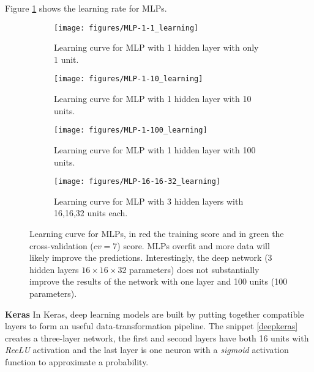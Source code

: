 \documentclass[11pt]{article}
\begin{document}
Figure \ref{fig:mlp_learning} shows the learning rate for MLPs.
\begin{figure}[h]
    \centering
    \begin{subfigure}[t]{1\textwidth}
        \centering
        \texttt{[image: figures/MLP-1-1\_learning]}
        \caption{Learning curve for MLP with 1 hidden layer with only 1 unit.}
    \end{subfigure}

    \begin{subfigure}[t]{1\textwidth}
        \centering
        \texttt{[image: figures/MLP-1-10\_learning]}
        \caption{Learning curve for MLP with 1 hidden layer with 10 units.}
    \end{subfigure}%

    \begin{subfigure}[t]{1\textwidth}
        \centering
        \texttt{[image: figures/MLP-1-100\_learning]}
        \caption{Learning curve for MLP with 1 hidden layer with 100 units.}
    \end{subfigure}%

    \begin{subfigure}[t]{1\textwidth}
        \centering
        \texttt{[image: figures/MLP-16-16-32\_learning]}
        \caption{Learning curve for MLP with 3 hidden layers with 16,16,32 units each.}
    \end{subfigure}%
    \label{fig:mlp_learning}
    \caption{Learning curve for  MLPs, in red the training score and in green the cross-validation ($cv=7$) score. MLPs overfit and more data will likely improve the predictions. Interestingly, the deep network (3 hidden layers $16 \times 16 \times 32$ parameters) does not substantially improve the results of the network with one layer and 100 units (100 parameters).}
\end{figure}


\textbf{Keras}
In Keras, deep learning models are built by putting together compatible layers to form an useful data-transformation pipeline. The snippet \ref{deepkeras} creates a three-layer network, the first and second layers have both 16 units with \emph{ReeLU} activation and the last layer is one neuron with a \emph{sigmoid} activation function to approximate a probability.
\end{document}
